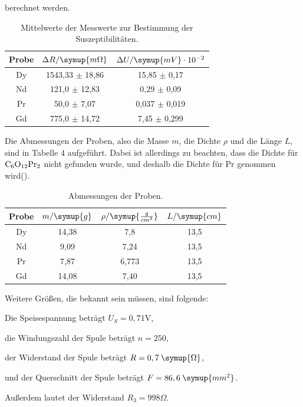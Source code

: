 berechnet werden.
\begin{table}[H]
  \centering
  \caption{Mittelwerte der Messwerte zur Bestimmung der Suszeptibilitäten.}
  \label{tab:Widerstand}
  \begin{tabular}{c c c}
    \toprule
    Probe  &  $\Delta R / \symup{m\Omega}$ & $\Delta U / \symup{mV}\cdot 10^{-2}$  \\
    \midrule
    Dy & 1543,33 $\pm$ 18,86 & 15,85 $\pm$ 0,17 \\
    Nd & 121,0 $\pm$ 12,83 & 0,29 $\pm$ 0,09\\
    Pr & 50,0 $\pm$ 7,07 & 0,037 $\pm$ 0,019 \\
    Gd & 775,0 $\pm$ 14,72 & 7,45 $\pm$ 0,299\\
    \bottomrule
  \end{tabular}
\end{table}

Die Abmessungen der Proben, also die Masse $m$, die Dichte $\rho$ und die Länge $L$, sind in Tabelle 4 aufgeführt. Dabei ist allerdings zu beachten, dass die Dichte für $\ce{C6O12Pr2}$ nicht gefunden wurde, und deshalb die Dichte für Pr genommen wird(\cite{sample2}).
\begin{table}[H]
  \centering
  \caption{Abmessungen der Proben.}
  \label{tab:Dy}
  \begin{tabular}{c c c c}
    \toprule
    Probe & $m/ \symup{g}$ & $\rho / \symup{\frac{g}{cm^3}}$   & $L / \symup{cm}$  \\
    \midrule
    Dy & 14,38 & 7,8 & 13,5\\
    Nd & 9,09 & 7,24 & 13,5\\
    Pr & 7,87 & 6,773 & 13,5 \\
    Gd & 14,08 & 7,40 & 13,5\\
    \bottomrule
  \end{tabular}
\end{table}

\noindent Weitere Größen, die bekannt sein müssen, sind folgende:

\noindent Die Speisespannung beträgt $U_S = 0,71\si{\volt}$,

\noindent die Windungszahl der Spule beträgt $n = 250$,

\noindent der Widerstand der Spule beträgt $R = 0,7 \: \symup{\Omega}$,

\noindent und der Querschnitt der Spule beträgt  $F = 86,6 \: \symup{mm^2}$.

\noindent Außerdem lautet der Widerstand $R_3 = 998 \Omega$.

